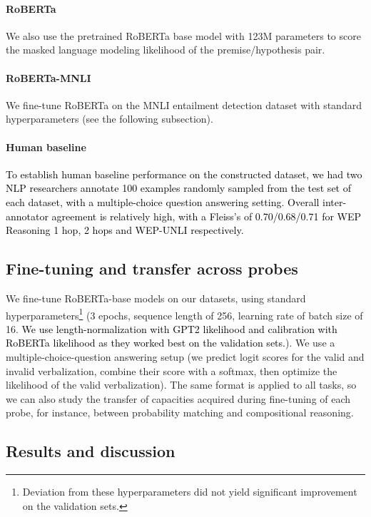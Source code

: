 \documentclass[11pt]{article}
\def \thecolor {black}
\newcommand{\blue}[1]{\textcolor{\thecolor}{#1}}
\begin{document}
\paragraph{RoBERTa} We also use the pretrained RoBERTa base model with 123M parameters  \cite{liu2019roberta} to score the masked language modeling likelihood of the premise/hypothesis pair.
\vspace{-1mm}
\paragraph{RoBERTa-MNLI} We fine-tune RoBERTa on the MNLI entailment detection dataset \citep{williamsmnli18} with standard hyperparameters (see the following subsection).
\vspace{-1mm}
\paragraph{Human baseline} \blue{To establish human baseline performance on the constructed dataset, we had two NLP researchers annotate 100 examples randomly sampled from the test set of each dataset, with a multiple-choice question answering setting. Overall inter-annotator agreement is relatively high, with a Fleiss’s  of 0.70/0.68/0.71 for WEP Reasoning 1 hop, 2 hops and WEP-UNLI respectively.
}

\subsection{Fine-tuning and transfer across probes}

We fine-tune RoBERTa-base models on our datasets, using standard \citep{mosbach2021on} hyperparameters\footnote{Deviation from these hyperparameters did not yield significant improvement on the validation sets.} (3 epochs, sequence length of 256, learning rate of  batch size of 16. \blue{We use length-normalization with GPT2 likelihood and calibration with RoBERTa likelihood as they worked best on the validation sets.}).
We use a multiple-choice-question answering setup (we predict logit scores for the valid and invalid verbalization, combine their score with a softmax, then optimize the likelihood of the valid verbalization). The same format is applied to all tasks, so we can also study the transfer of capacities acquired during fine-tuning of each probe, for instance, between probability matching and compositional reasoning.



\subsection{Results and discussion}
\end{document}
